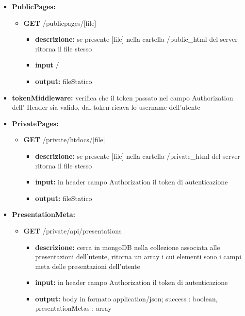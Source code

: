 {{\begin{itemize}
		\item \textbf{PublicPages:}
			\begin{itemize}
			\item  \textbf{GET} /publicpages/[file] 
				\begin{itemize} 
				\item \textbf{descrizione:} se presente [file] nella cartella /public\_html del server ritorna il file stesso 
				\item \textbf{input} /
				\item \textbf{output:} fileStatico
				\end{itemize}
			\end{itemize}
			
		\item \textbf{tokenMiddleware:} verifica che il token passato nel campo Authorization dell' Header sia valido, dal token ricava lo username dell'utente
		
		\item \textbf{PrivatePages:}
			\begin{itemize}
			\item  \textbf{GET} /private/htdocs/[file] 
				\begin{itemize} 
				\item \textbf{descrizione:} se presente [file] nella cartella /private\_html del server ritorna il file stesso
				\item \textbf{input:} in header campo Authorization il token di autenticazione
				\item \textbf{output:} fileStatico
				\end{itemize}
			\end{itemize}
			
		\item \textbf{PresentationMeta:}
			\begin{itemize}
			\item  \textbf{GET} /private/api/presentations 
				\begin{itemize} 
				\item \textbf{descrizione:} cerca in mongoDB nella collezione associata alle presentazioni dell'utente, ritorna un array i cui elementi sono i campi meta delle presentazioni dell'utente
				\item \textbf{input:} in header campo Authorization il token di autenticazione
				\item \textbf{output:} body in formato application/json; success : boolean, presentationMetas : array
				\end{itemize}
			\end{itemize}
			

\end{itemize}}}
